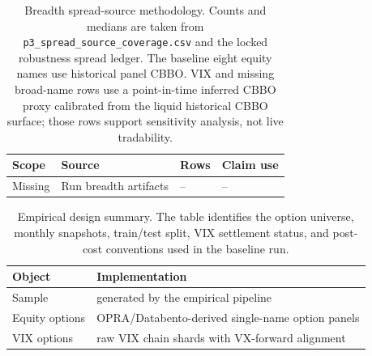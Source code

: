 \begin{table}[H]
\centering
\scriptsize
{}
  {}
  {\begin{tabular}{llll}\toprule Scope & Source & Rows & Claim use \\\midrule Missing & Run breadth artifacts & -- & -- \\\bottomrule\end{tabular}}
\caption{Breadth spread-source methodology. Counts and medians are taken from
\texttt{p3\_spread\_source\_coverage.csv} and the locked robustness spread ledger. The
baseline eight equity names use historical panel CBBO. VIX
and missing broad-name rows use a point-in-time inferred CBBO proxy calibrated from the
liquid historical CBBO surface; those rows support sensitivity analysis, not live
tradability.}
\label{tab:breadth_spread_methodology}
\end{table}

\begin{table}[H]
\centering
\scriptsize
{}
  {\resizebox{0.94\textwidth}{!}{}}
  {\begin{tabular}{ll}\toprule Object & Implementation \\\midrule
  Sample & generated by the empirical pipeline \\
  Equity options & OPRA/Databento-derived single-name option panels \\
  VIX options & raw VIX chain shards with VX-forward alignment \\\bottomrule\end{tabular}}
\caption{Empirical design summary. The table identifies the option universe, monthly
snapshots, train/test split, VIX settlement status, and post-cost conventions used in the
baseline run.}
\label{tab:data_summary}
\end{table}

